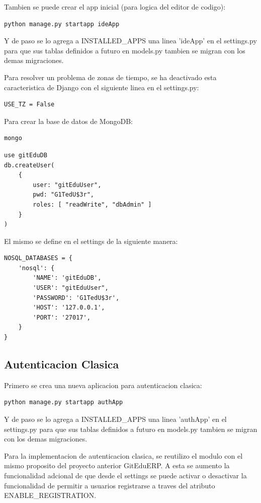 Tambien se puede crear el app inicial (para logica del editor de codigo):
\begin{lstlisting}
python manage.py startapp ideApp
\end{lstlisting}

Y de paso se lo agrega a INSTALLED\_APPS una linea 'ideApp' en el settings.py para que sus tablas definidos a futuro en models.py tambien se migran con los demas migraciones.

Para resolver un problema de zonas de tiempo, se ha deactivado esta caracteristica de Django con el siguiente linea en el settings.py:
\lstset{language=Python}
\begin{lstlisting}
USE_TZ = False
\end{lstlisting}
\lstset{language=Bash}

Para crear la base de datos de MongoDB:
\begin{lstlisting}
mongo
\end{lstlisting}
\lstset{language=sql}
\begin{lstlisting}
use gitEduDB
db.createUser(
    {
        user: "gitEduUser",
        pwd: "G1TedU$3r",
        roles: [ "readWrite", "dbAdmin" ]
    }
)
\end{lstlisting}
\lstset{language=Bash}

El mismo se define en el settings de la siguiente manera:
\lstset{language=Python}
\begin{lstlisting}
NOSQL_DATABASES = {
    'nosql': {
        'NAME': 'gitEduDB',
        'USER': "gitEduUser",
        'PASSWORD': 'G1TedU$3r',
        'HOST': '127.0.0.1',
        'PORT': '27017',
    }
}
\end{lstlisting}
\lstset{language=Bash}

\subsection{Autenticacion Clasica}

Primero se crea una nueva aplicacion para autenticacion clasica:
\begin{lstlisting}
python manage.py startapp authApp
\end{lstlisting}

Y de paso se lo agrega a INSTALLED\_APPS una linea 'authApp' en el settings.py para que sus tablas definidos a futuro en models.py tambien se migran con los demas migraciones.

Para la implementacion de autenticacion clasica, se reutilizo el modulo con el mismo proposito del proyecto anterior GitEduERP. A esta se aumento la funcionalidad adcional de que desde el settings se puede activar o desactivar la funcionalidad de permitir a usuarios registrarse a traves del atributo ENABLE\_REGISTRATION. 

